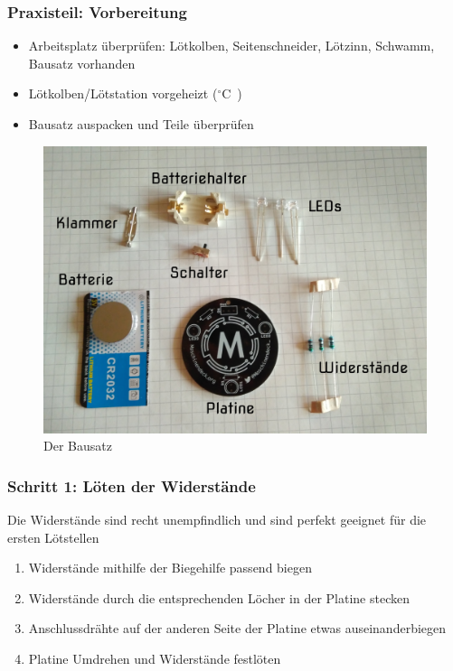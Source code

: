 \documentclass[10pt]{beamer}
\begin{document}
	\begin{frame}
	\frametitle{Praxisteil: Vorbereitung}
	\begin{itemize}
		\item{Arbeitsplatz überprüfen: Lötkolben, Seitenschneider, Lötzinn, Schwamm, Bausatz vorhanden}
		\item{Lötkolben/Lötstation vorgeheizt (\unit[350]{$^\circ$C})}
		\item{Bausatz auspacken und Teile überprüfen}
	\end{itemize}
	\begin{figure}[hbtp]
		\centering
		\includegraphics[width=\linewidth*5/10]{images/badge.jpg}
		\caption{Der Bausatz}
	\end{figure}
	\end{frame}

	\begin{frame}
	\frametitle{Schritt 1: Löten der Widerstände}
	Die Widerstände sind recht unempfindlich und sind perfekt geeignet für die ersten Lötstellen
	\begin{enumerate} 
		\item{Widerstände mithilfe der Biegehilfe passend biegen}
		\item{Widerstände durch die entsprechenden Löcher in der Platine stecken}
		\item{Anschlussdrähte auf der anderen Seite der Platine etwas auseinanderbiegen}
		\item{Platine Umdrehen und Widerstände festlöten}
	\end{enumerate}
	\end{frame}
\end{document}
